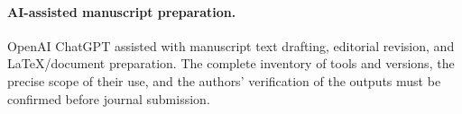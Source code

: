 \paragraph{AI-assisted manuscript preparation.}
OpenAI ChatGPT assisted with manuscript text drafting, editorial revision, and LaTeX/document preparation. The complete inventory of tools and versions, the precise scope of their use, and the authors' verification of the outputs must be confirmed before journal submission.
